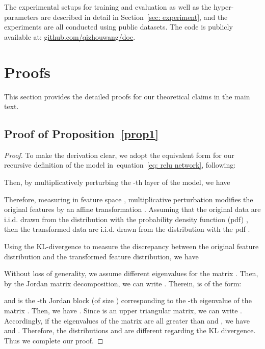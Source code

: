 \documentclass{article} \usepackage{iclr2022_conference,times}
\def\eqref#1{equation~\ref{#1}}
\begin{document}
The experimental setups for training and evaluation as well as the hyper-parameters are described in detail in Section~\ref{sec: experiment}, and the experiments are all conducted using public datasets. The code is publicly available at: \href{https://github.com/QizhouWang/DOE}{{github.com/qizhouwang/doe}}.






\clearpage
\appendix

\section{Proofs} \label{app: proof}

This section provides the detailed proofs for our theoretical claims in the main text.

\subsection{Proof of Proposition~\ref{prop1}} \label{app: proof1}

\begin{proof}
To make the derivation clear, we adopt the equivalent form for our recursive definition of the model in~\eqref{eq: relu network}, following: 

Then, by multiplicatively perturbing the -th layer of the model, we have 

Therefore, measuring in feature space , multiplicative perturbation modifies the original features  by an affine transformation . Assuming that the original data are i.i.d. drawn from the distribution with the probability density function (pdf) , then the transformed data are i.i.d. drawn from the distribution with the pdf . 

Using the KL-divergence to measure the discrepancy between the original feature distribution and the transformed feature distribution, we have 

{Without loss of generality, we assume  different eigenvalues for the matrix . Then, by the Jordan matrix decomposition, we can write . Therein,  is of the form:}

{and  is the -th Jordan block (of size ) corresponding to the -th eigenvalue of the matrix . Then, we have . Since  is an upper triangular matrix, we can write . Accordingly, if the eigenvalues of the matrix  are all greater than  and , we have  and . Therefore, the distributions  and  are different regarding the KL divergence. Thus we complete our proof.}
\end{proof}
\end{document}
